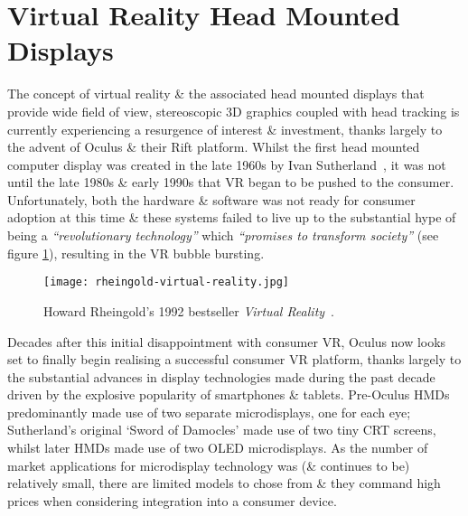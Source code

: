 
\section{Virtual Reality Head Mounted Displays}
The concept of virtual reality \& the associated head mounted displays that provide wide field of view, stereoscopic 3D graphics coupled with head tracking is currently experiencing a resurgence of interest \& investment, thanks largely to the advent of Oculus \& their Rift platform. Whilst the first head mounted computer display was created in the late 1960s by Ivan Sutherland~\cite{Rheingold1992}, it was not until the late 1980s \& early 1990s that VR began to be pushed to the consumer. Unfortunately, both the hardware \& software was not ready for consumer adoption at this time \& these systems failed to live up to the substantial hype of being a \textit{``revolutionary technology''} which \textit{``promises to transform society''} (see figure \ref{rheingold-virtual-reality.jpg}), resulting in the VR bubble bursting.

\begin{figure}[h]
	\begin{center}
		\texttt{[image: rheingold-virtual-reality.jpg]}
		\caption{Howard Rheingold's 1992 bestseller \textit{Virtual Reality}~\cite{Rheingold1992}.}
		\label{rheingold-virtual-reality.jpg}
	\end{center}
\end{figure}

Decades after this initial disappointment with consumer VR, Oculus now looks set to finally begin realising a successful consumer VR platform, thanks largely to the substantial advances in display technologies made during the past decade driven by the explosive popularity of smartphones \& tablets. Pre-Oculus HMDs predominantly made use of two separate microdisplays, one for each eye; Sutherland's original `Sword of Damocles' made use of two tiny CRT screens, whilst later HMDs made use of two OLED microdisplays. As the number of market applications for microdisplay technology was (\& continues to be) relatively small, there are limited models to chose from \& they command high prices when considering integration into a consumer device.

